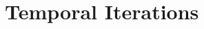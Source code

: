\documentclass[../fem.tex]{subfile}
\begin{document}
\section{Temporal Iterations}%
\label{sec:temporal_iterations}
\end{document}
